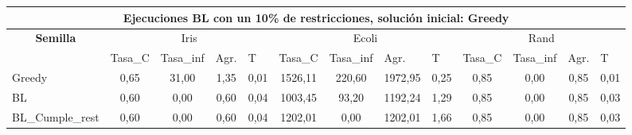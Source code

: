 \documentclass[12pt, spanish]{article}
\begin{document}
\begin{table}[H]
\small
\begin{adjustwidth}{-1.9cm}{-1.9cm}%


\begin{tabular}{|l|c|c|c|c|c|c|c|c|c|c|c|c|}
\hline
\multicolumn{13}{|c|}{\textbf{Ejecuciones BL con un 10\% de restricciones, solución inicial: Greedy}}                                                                                                                                                                                                                                                                                                                  \\ \hline
\multicolumn{1}{|c|}{\multirow{2}{*}{\textbf{Semilla}}} & \multicolumn{4}{c|}{Iris}                                                                                          & \multicolumn{4}{c|}{Ecoli}                                                                                         & \multicolumn{4}{c|}{Rand}                                                                                          \\ \cline{2-13} 
\multicolumn{1}{|c|}{}                                  & \multicolumn{1}{l|}{Tasa\_C} & \multicolumn{1}{l|}{Tasa\_inf} & \multicolumn{1}{l|}{Agr.} & \multicolumn{1}{l|}{T} & \multicolumn{1}{l|}{Tasa\_C} & \multicolumn{1}{l|}{Tasa\_inf} & \multicolumn{1}{l|}{Agr.} & \multicolumn{1}{l|}{T} & \multicolumn{1}{l|}{Tasa\_C} & \multicolumn{1}{l|}{Tasa\_inf} & \multicolumn{1}{l|}{Agr.} & \multicolumn{1}{l|}{T} \\ \hline
Greedy                                                  & 0,65                         & 31,00                          & 1,35                      & 0,01                   & 1526,11                      & 220,60                         & 1972,95                   & 0,25                   & 0,85                         & 0,00                           & 0,85                      & 0,01                   \\ \hline
BL                                                      & 0,60                         & 0,00                           & 0,60                      & 0,04                   & 1003,45                      & 93,20                          & 1192,24                   & 1,29                   & 0,85                         & 0,00                           & 0,85                      & 0,03                   \\ \hline
BL\_Cumple\_rest                                        & 0,60                         & 0,00                           & 0,60                      & 0,04                   & 1202,01                      & 0,00                           & 1202,01                   & 1,66                   & 0,85                         & 0,00                           & 0,85                      & 0,03                   \\ \hline

\end{tabular}
\end{adjustwidth}
\end{table}
\end{document}
